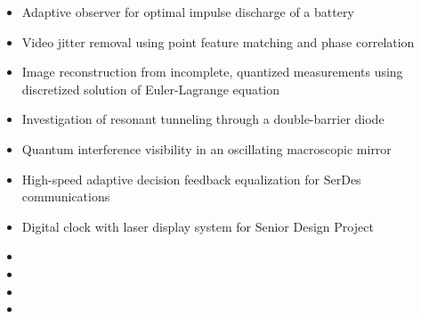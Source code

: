\documentclass[9pt]{extarticle}
\begin{document}
\begin{itemize}[itemsep=-3pt]
\item Adaptive observer for optimal impulse discharge of a battery
\item Video jitter removal using point feature matching and phase correlation
\item Image reconstruction from incomplete, quantized measurements using discretized solution of Euler-Lagrange equation
\item Investigation of resonant tunneling through a double-barrier diode
\item Quantum interference visibility in an oscillating macroscopic mirror
\item High-speed adaptive decision feedback equalization for SerDes communications
\item Digital clock with laser display system for Senior Design Project
\end{itemize}
\vspace{-3pt}

\begin{itemize}[itemsep=-3pt]
\item[] 
\item[] 
\item[] 
\item[] 
\end{itemize}
\vspace{-3pt}

\end{document}
